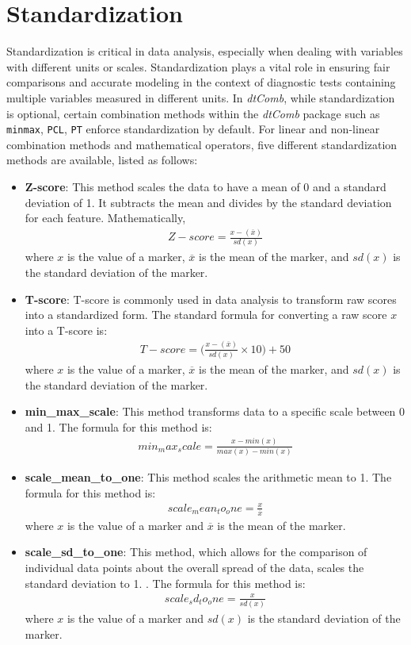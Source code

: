 \documentclass[10pt]{article}
\newcommand{\dtComb}{\textit{dtComb}}
\begin{document}
\section{Standardization}
Standardization is critical in data analysis, especially when dealing with variables with different units or scales. Standardization plays a vital role in ensuring fair comparisons and accurate modeling in the context of diagnostic tests containing multiple variables measured in different units. In \dtComb{}, while standardization is optional, certain combination methods within the \dtComb{} package such as \texttt{minmax}, \texttt{PCL}, \texttt{PT} enforce standardization by default. For linear and non-linear combination methods and mathematical operators, five different standardization methods are available, listed as follows:
\begin{itemize}
  \item \textbf{Z-score}: This method scales the data to have a mean of 0 and a standard deviation of 1. It subtracts the mean and divides by the standard deviation for each feature. Mathematically,
\begin{gather*} 
    Z-score = \frac{x - (\overline x)}{sd(x)}
    \end{gather*}
     where $x$ is the value of a marker, $\overline{x}$ is the mean of the marker, and $sd(x)$ is the standard deviation of the marker.
     \item \textbf{T-score}: T-score is commonly used in data analysis to transform raw scores into a standardized form. The standard formula for converting a raw score $x$ into a T-score is:
    \begin{gather*} 
    T-score = \Biggl(\frac{x - (\overline x)}{sd(x)}\times 10 \Biggl) +50
    \end{gather*}
    where $x$ is the value of a marker, $\overline{x}$ is the mean of the marker, and $sd(x)$ is the standard deviation of the marker.
   \item \textbf{min\_max\_scale}: This method transforms data to a specific scale between 0 and 1. The formula for this method is:
  \begin{gather*} 
    min_max_scale = \frac{x - min(x)}{max(x) - min(x)}
    \end{gather*}
    \item \textbf{scale\_mean\_to\_one}: This method scales the arithmetic mean to 1. The formula for this method is:
      \begin{gather*} 
   scale_mean_to_one =  \frac{x}{\overline{x}}
    \end{gather*}
    where $x$ is the value of a marker and $\overline{x}$ is the mean of the marker.
    \item \textbf{scale\_sd\_to\_one}: This method, which allows for the comparison of individual data points about the overall spread of the data, scales the standard deviation to 1. . The formula for this method is:
   \begin{gather*} 
   scale_sd_to_one = \frac{x}{sd(x)}
    \end{gather*}
    where $x$ is the value of a marker and $sd(x)$ is the standard deviation of the marker.
\end{itemize}
\end{document}
